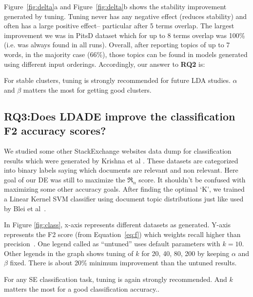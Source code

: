 \documentclass[twocolumn,5p,sort&compress]{elsarticle}
\newcommand{\eq}[1]{Equation~\ref{eq:#1}}
\theoremstyle{break}
\begin{document}
 Figure~\ref{fig:delta}a and Figure~\ref{fig:delta}b shows the stability improvement
 generated by tuning.
   Tuning never
  has any negative effect (reduces stability) and often has a large positive effect--
  particular  after 5 terms overlap.
   The largest improvement  we
   was  in PitsD dataset which for up to 8 terms overlap was 100\% (i.e. was always
   found in all runs).
   Overall, after reporting topics of up to 7 words, in the majority case (66\%),
  those topics can be found in models generated using different input orderings.
  Accordingly, our answer to {\bf RQ2} is:

\begin{lesson}
For stable clusters, tuning is strongly recommended for future LDA studies. $\alpha$ and $\beta$ matters the most for getting good clusters.
\end{lesson}

\subsection{\textbf{RQ3:Does LDADE improve the classification F2 accuracy scores?}}\label{sect:rq3} 

We studied some other StackExchange websites data dump for classification results which were generated by Krishna et al \cite{krishna2016bigse}. These datasets are categorized into binary labels saying which documents are relevant and non relevant. Here goal of our DE was still to maximize the $\Re_n$ score. It shouldn't be confused with maximizing some other accuracy goals. After finding the optimal `K', we trained a Linear Kernel SVM classifier using document topic distributions just like used by Blei et al~\cite{blei2003latent}.

In Figure \ref{fig:class}, x-axis represents different datasets as generated. Y-axis represents the F2 score
(from \eq{f}) which weights recall higher than precision~\cite{powers2011evaluation}. One legend called as ``untuned'' uses default parameters with $k=10$. Other legends in the graph shows tuning of $k$ for 20, 40, 80, 200 by keeping $\alpha$ and $\beta$ fixed. There is about 20\% minimum improvement than the untuned results.

\begin{lesson}
For any SE classification task, tuning is again strongly recommended. And $k$ matters the most for a good classification accuracy..
\end{lesson}
\end{document}
